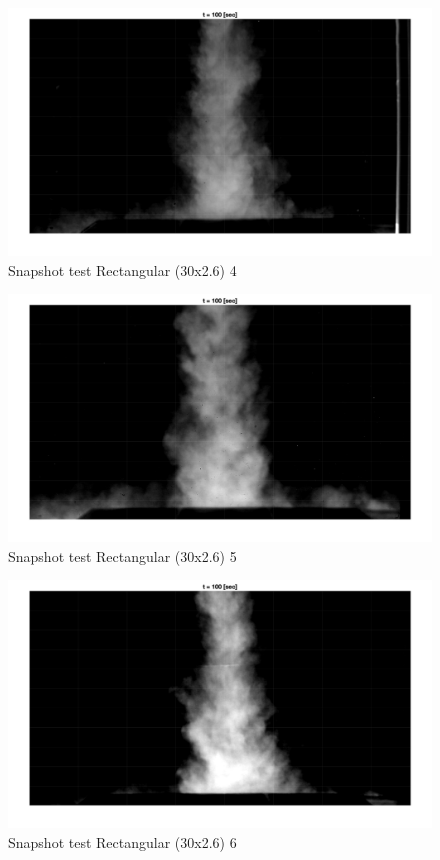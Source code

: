 \begin{figure}[ht!]
    \centering
    \includegraphics[width=\linewidth]{Images/Rec30_4_t100.jpg}
    \caption{Snapshot test Rectangular (30x2.6) 4}
\end{figure}

\begin{figure}[ht!]
    \centering
    \includegraphics[width=\linewidth]{Images/Rec30_5_t100.jpg}
    \caption{Snapshot test Rectangular (30x2.6) 5}
\end{figure}

\begin{figure}[ht!]
    \centering
    \includegraphics[width=\linewidth]{Images/Rec30_6_t100.jpg}
    \caption{Snapshot test Rectangular (30x2.6) 6}
\end{figure}

